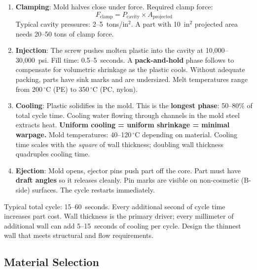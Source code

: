 \documentclass[11pt,letterpaper,twoside,openany]{book}
\newcommand{\degC}{\ensuremath{{}^{\circ}\text{C}}}
\begin{document}
\begin{enumerate}[leftmargin=1.5em]
  \item \textbf{Clamping}: Mold halves close under force. Required clamp force:
  \begin{equation}
    F_{\text{clamp}} = P_{\text{cavity}} \times A_{\text{projected}}
  \end{equation}
  Typical cavity pressures: 2--5~tons/in$^2$. A part with 10~in$^2$ projected area needs 20--50 tons of clamp force.

  \item \textbf{Injection}: The screw pushes molten plastic into the cavity at 10,000--30,000~psi. Fill time: 0.5--5~seconds. A \textbf{pack-and-hold} phase follows to compensate for volumetric shrinkage as the plastic cools. Without adequate packing, parts have sink marks and are undersized. Melt temperatures range from 200\,$^{\circ}$C (PE) to 350\,$^{\circ}$C (PC, nylon).

  \item \textbf{Cooling}: Plastic solidifies in the mold. This is the \textbf{longest phase}: 50--80\% of total cycle time. Cooling water flowing through channels in the mold steel extracts heat. \textbf{Uniform cooling = uniform shrinkage = minimal warpage.} Mold temperatures: 40--120\,\degC{} depending on material. Cooling time scales with the \emph{square} of wall thickness; doubling wall thickness quadruples cooling time.

  \item \textbf{Ejection}: Mold opens, ejector pins push part off the core. Part must have \textbf{draft angles} so it releases cleanly. Pin marks are visible on non-cosmetic (B-side) surfaces. The cycle restarts immediately.
\end{enumerate}

\begin{warningbox}[Cycle Time = Cost]
Typical total cycle: 15--60~seconds. Every additional second of cycle time increases part cost. Wall thickness is the primary driver; every millimeter of additional wall can add 5--15~seconds of cooling per cycle. Design the thinnest wall that meets structural and flow requirements.
\end{warningbox}


\subsection{Material Selection}
\label{sec:materials}
\end{document}
